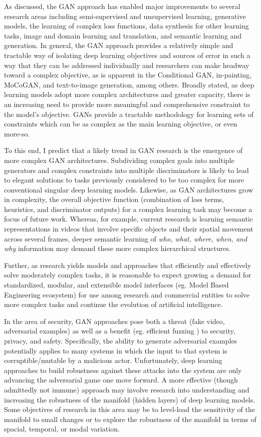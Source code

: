 \documentclass[11pt]{article}
\begin{document}
As discussed, the GAN approach has enabled major improvements to several research areas including semi-supervised and unsupervised learning, generative models, the learning of complex loss functions, data synthesis for other learning tasks, image and domain learning and translation, and semantic learning and generation.  In general, the GAN approach provides a relatively simple and tractable way of isolating deep learning objectives and sources of error in such a way that they can be addressed individually and researchers can make headway toward a complex objective, as is apparent in the Conditional GAN, in-painting, MoCoGAN, and text-to-image generation, among others.  Broadly stated, as deep learning models adopt more complex architectures and greater capacity, there is an increasing need to provide more meaningful and comprehensive constraint to the model's objective.  GANs provide a tractable methodology for learning sets of constraints which can be as complex as the main learning objective, or even more-so.

To this end, I predict that a likely trend in GAN research is the emergence of more complex GAN architectures.  Subdividing complex goals into multiple generators and complex constraints into multiple discriminators is likely to lead to elegant solutions to tasks previously considered to be too complex for more conventional singular deep learning models.  Likewise, as GAN architectures grow in complexity, the overall objective function (combination of loss terms, heuristics, and discriminator outputs) for a complex learning task may become a focus of future work.  Whereas, for example, current research is learning semantic representations in videos that involve specific objects and their spatial movement across several frames, deeper semantic learning of \textit{who, what, where, when, and why} information may demand these more complex hierarchical structures.

Further, as research yields models and approaches that efficiently and effectively solve moderately complex tasks, it is reasonable to expect growing a demand for standardized, modular, and extensible model interfaces (eg. Model Based Engineering ecosystem) for use among research and commercial entities to solve more complex tasks and continue the evolution of artificial intelligence.

In the area of security, GAN approaches pose both a threat (fake video, adversarial examples) as well as a benefit (eg. efficient fuzzing \cite{hu2018ganfuzz}) to security, privacy, and safety.  Specifically, the ability to generate adversarial examples potentially applies to many systems in which the input to that system is corruptible/mutable by a malicious actor.  Unfortunately, deep learning approaches to build robustness against these attacks into the system are only advancing the adversarial game one move forward.  A more effective (though admittedly not immune) approach may involve research into understanding and increasing the robustness of the manifold (hidden layers) of deep learning models.  Some objectives of research in this area may be to level-load the sensitivity of the manifold to small changes or to explore the robustness of the manifold in terms of spacial, temporal, or modal variation.
\end{document}
